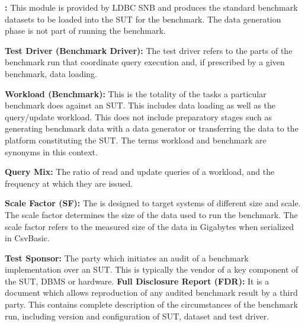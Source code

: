 {\flushleft \textbf{\datagen:}} This module is provided by LDBC SNB and produces the standard benchmark datasets to be loaded into the SUT for the benchmark. The data generation phase is not part of running the benchmark.

{\flushleft \textbf{Test Driver (Benchmark Driver):}} The test driver refers to the parts of the benchmark run that coordinate query execution and, if prescribed by a given benchmark, data loading.

{\flushleft \textbf{Workload (Benchmark):}} This is the totality of the tasks a particular benchmark does against an SUT. This includes data loading as well as the query/update workload. This does not include preparatory stages such as generating benchmark data with a data generator or transferring the data to the platform constituting the SUT.
The terms workload and benchmark are synonyms in this context. 

{\flushleft \textbf{Query Mix:}} The ratio of read and update queries
of a workload, and the frequency at which they are issued.

{\flushleft \textbf{Scale Factor (SF):}} The \ldbcsnb is designed to target systems of different size and scale. The scale factor determines the size of the data used to run the benchmark. The scale factor refers to the measured size of the data in Gigabytes when serialized in CsvBasic.

{\flushleft \textbf{Test Sponsor:}} The party which initiates an audit of a benchmark implementation over an SUT. This is typically the vendor of a key component of the SUT, \eg DBMS or hardware.
{\flushleft \textbf{Full Disclosure Report (FDR):}} It is a document which allows reproduction of any audited benchmark result by a third party. This contains complete description of the circumstances of the benchmark run, including version and configuration of SUT, dataset and test driver.

%

